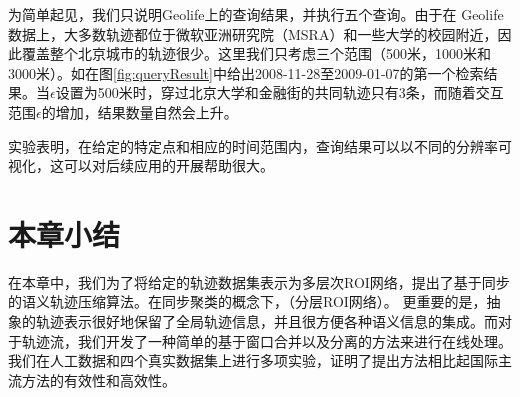 为简单起见，我们只说明Geolife上的查询结果，并执行五个查询。由于在 Geolife数据上，大多数轨迹都位于微软亚洲研究院（MSRA）和一些大学的校园附近，因此覆盖整个北京城市的轨迹很少。这里我们只考虑三个范围（500米，1000米和3000米）。如在图\ref{fig:queryResult}中给出2008-11-28至2009-01-07的第一个检索结果。当$\epsilon$设置为500米时，穿过北京大学和金融街的共同轨迹只有3条，而随着交互范围$ \epsilon $的增加，结果数量自然会上升。

实验表明，在给定的特定点和相应的时间范围内，查询结果可以以不同的分辨率可视化，这可以对后续应用的开展帮助很大。

\section{本章小结}
在本章中，我们为了将给定的轨迹数据集表示为多层次ROI网络，提出了基于同步的语义轨迹压缩算法\CascadeSync。在同步聚类的概念下，（分层ROI网络）。 更重要的是，抽象的轨迹表示很好地保留了全局轨迹信息，并且很方便各种语义信息的集成。而对于轨迹流，我们开发了一种简单的基于窗口合并以及分离的方法来进行在线处理。我们在人工数据和四个真实数据集上进行多项实验，证明了提出方法相比起国际主流方法的有效性和高效性。
